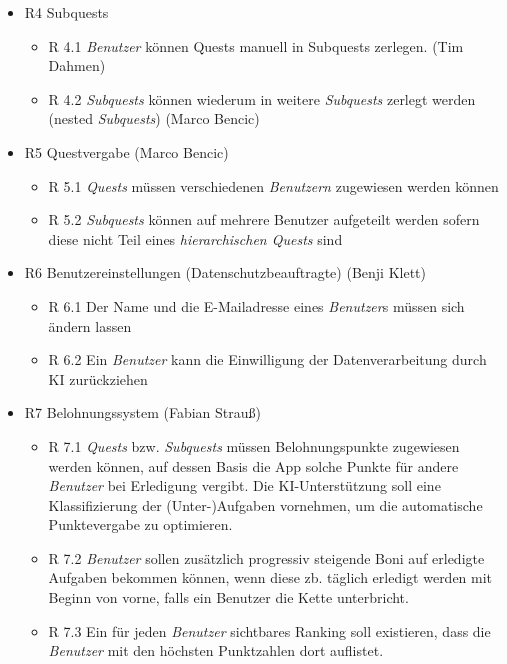 \documentclass{article}
\begin{document}
\begin{itemize}
\item R4 Subquests
    \begin{itemize}
        \item R 4.1 \textit{Benutzer} können Quests manuell in Subquests zerlegen. (Tim Dahmen) \item R 4.2 \textit{Subquests} können wiederum in weitere \textit{Subquests} zerlegt werden (nested \textit{Subquests}) (Marco Bencic) \end{itemize} \item R5 Questvergabe (Marco Bencic) \begin{itemize} \item R 5.1 \textit{Quests} müssen verschiedenen \textit{Benutzern} zugewiesen werden können \item R 5.2 \textit{Subquests} können auf mehrere Benutzer aufgeteilt werden sofern diese nicht Teil eines \textit{hierarchischen Quests} sind
    \end{itemize}
\item R6 Benutzereinstellungen (Datenschutzbeauftragte) (Benji Klett)
    \begin{itemize}
        \item R 6.1 Der Name und die E-Mailadresse eines \textit{Benutzer}s müssen sich ändern lassen
        \item R 6.2 Ein \textit{Benutzer} kann die Einwilligung der Datenverarbeitung durch KI zurückziehen
    \end{itemize}
\item R7 Belohnungssystem (Fabian Strauß)
    \begin{itemize}
        \item R 7.1 \textit{Quests} bzw. \textit{Subquests} müssen Belohnungspunkte zugewiesen werden können, auf dessen Basis die App solche Punkte für andere \textit{Benutzer} bei Erledigung vergibt. Die KI-Unterstützung soll eine Klassifizierung der (Unter-)Aufgaben vornehmen, um die automatische Punktevergabe zu optimieren.
        \item R 7.2 \textit{Benutzer} sollen zusätzlich progressiv steigende Boni auf erledigte Aufgaben bekommen können, wenn diese zb. täglich erledigt werden mit Beginn von vorne, falls ein Benutzer die Kette unterbricht.
        \item R 7.3 Ein für jeden \textit{Benutzer} sichtbares Ranking soll existieren, dass die \textit{Benutzer} mit den höchsten Punktzahlen dort auflistet.
    \end{itemize}

\end{itemize}
\end{document}

